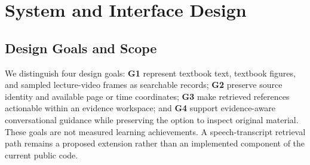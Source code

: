 \documentclass[manuscript,screen,nonacm]{acmart}
\begin{document}
\section{System and Interface Design}
\subsection{Design Goals and Scope}
We distinguish four design goals: \textbf{G1} represent textbook text, textbook figures, and sampled lecture-video frames as searchable records; \textbf{G2} preserve source identity and available page or time coordinates; \textbf{G3} make retrieved references actionable within an evidence workspace; and \textbf{G4} support evidence-aware conversational guidance while preserving the option to inspect original material. These goals are not measured learning achievements. A speech-transcript retrieval path remains a proposed extension rather than an implemented component of the current public code.
\end{document}
